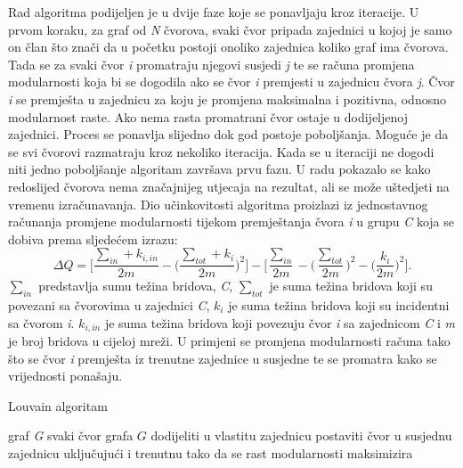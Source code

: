 \documentclass[times, utf8, diplomski]{fer}
\begin{document}
Rad algoritma podijeljen je u dvije faze koje se ponavljaju kroz iteracije. U prvom koraku, za graf od \textit{N} čvorova, svaki čvor pripada zajednici u kojoj je samo on član što znači da u početku postoji onoliko zajednica koliko graf ima čvorova. Tada se za svaki čvor \textit{i} promatraju njegovi susjedi \textit{j} te se računa promjena modularnosti koja bi se dogodila ako se čvor \textit{i} premjesti u zajednicu čvora \textit{j}. Čvor \textit{i} se premješta u zajednicu za koju je promjena maksimalna i pozitivna, odnosno modularnost raste. Ako nema rasta promatrani čvor ostaje u dodijeljenoj zajednici. Proces se ponavlja slijedno dok god postoje poboljšanja. Moguće je da se svi čvorovi razmatraju kroz nekoliko iteracija. Kada se u iteraciji ne dogodi niti jedno poboljšanje algoritam završava prvu fazu. U radu \cite{blondel2008fast} pokazalo se kako redoslijed čvorova nema značajnijeg utjecaja na rezultat, ali se može uštedjeti na vremenu izračunavanja. Dio učinkovitosti algoritma proizlazi iz jednostavnog računanja promjene modularnosti tijekom premještanja čvora \textit{i} u grupu \textit{C} koja se dobiva prema sljedećem izrazu: 
\begin{equation}
	\Delta Q =  \bigg[ \frac{\sum_{in} + k_{i,in}}{2m} - \bigg( \dfrac{\sum_{tot} + k_{i} }{2m} \bigg)^{2} \bigg] 
	- 
	\bigg[ \dfrac{\sum_{in}}{2m} - \big( \dfrac{\sum_{tot}}{2m} \big)^{2} - \bigg( \dfrac{k_{i}}{2m} \bigg)^{2} \bigg] .
\end{equation}
\bigskip
$\sum_{in}$ predstavlja sumu težina bridova, \textit{C}, $\sum_{tot}$ je suma težina bridova koji su povezani sa čvorovima u zajednici \textit{C}, $k_{i}$ je suma težina bridova koji su incidentni sa čvorom \textit{i}. $k_{i,in}$ je suma težina bridova koji povezuju čvor \textit{i} sa zajednicom \textit{C} i \textit{m} je broj bridova u cijeloj mreži. U primjeni se promjena modularnosti računa tako što se čvor \textit{i} premješta iz trenutne zajednice u susjedne te se promatra kako se vrijednosti ponašaju.

\bigskip
\begin{algorithm}
	\caption{Louvain algoritam}
	\begin{algorithmic}[1]
		\REQUIRE graf \textit{G}
		\REPEAT 
		\STATE svaki čvor grafa $G$ dodijeliti u vlastitu zajednicu
		\STATE postaviti čvor u susjednu zajednicu uključujući i trenutnu tako da se rast modularnosti maksimizira
		\ENDFOR
		\ENDWHILE
		\ELSE {} 
		\ENDIF
		\UNTIL{}
	\end{algorithmic}
\end{algorithm}
\bigskip
\end{document}

